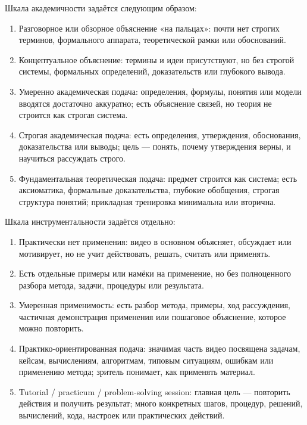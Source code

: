 Шкала академичности задаётся следующим образом:
\begin{enumerate}
    \item Разговорное или обзорное объяснение «на пальцах»:
    почти нет строгих терминов, формального аппарата, теоретической рамки
    или обоснований.
    \item Концептуальное объяснение:
    термины и идеи присутствуют, но без строгой системы, формальных определений,
    доказательств или глубокого вывода.
    \item Умеренно академическая подача:
    определения, формулы, понятия или модели вводятся достаточно аккуратно;
    есть объяснение связей, но теория не строится как строгая система.
    \item Строгая академическая подача:
    есть определения, утверждения, обоснования, доказательства или выводы;
    цель — понять, почему утверждения верны, и научиться рассуждать строго.
    \item Фундаментальная теоретическая подача:
    предмет строится как система; есть аксиоматика, формальные доказательства,
    глубокие обобщения, строгая структура понятий; прикладная тренировка
    минимальна или вторична.
\end{enumerate}

Шкала инструментальности задаётся отдельно:
\begin{enumerate}
    \item Практически нет применения:
    видео в основном объясняет, обсуждает или мотивирует, но не учит действовать,
    решать, считать или применять.
    \item Есть отдельные примеры или намёки на применение,
    но без полноценного разбора метода, задачи, процедуры или результата.
    \item Умеренная применимость:
    есть разбор метода, примеры, ход рассуждения, частичная демонстрация
    применения или пошаговое объяснение, которое можно повторить.
    \item Практико-ориентированная подача:
    значимая часть видео посвящена задачам, кейсам, вычислениям, алгоритмам,
    типовым ситуациям, ошибкам или применению метода; зритель понимает,
    как применять материал.
    \item Tutorial / practicum / problem-solving session:
    главная цель — повторить действия и получить результат; много конкретных
    шагов, процедур, решений, вычислений, кода, настроек или практических действий.
\end{enumerate}

